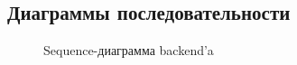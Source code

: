\documentclass{article}
\begin{document}
\subsection{Диаграммы последовательности}
\begin{figure}[H]
    \caption{Sequence-диаграмма backend'a}
\end{figure}
\end{document}
